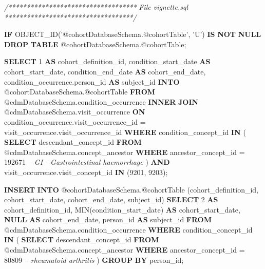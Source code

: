 \documentclass[]{article}
\newenvironment{Shaded}{\begin{snugshade}}{\end{snugshade}}
\newcommand{\CommentTok}[1]{\textcolor[rgb]{0.56,0.35,0.01}{\textit{#1}}}
\newcommand{\DecValTok}[1]{\textcolor[rgb]{0.00,0.00,0.81}{#1}}
\newcommand{\FunctionTok}[1]{\textcolor[rgb]{0.00,0.00,0.00}{#1}}
\newcommand{\KeywordTok}[1]{\textcolor[rgb]{0.13,0.29,0.53}{\textbf{#1}}}
\newcommand{\NormalTok}[1]{#1}
\newcommand{\StringTok}[1]{\textcolor[rgb]{0.31,0.60,0.02}{#1}}
\begin{document}
\begin{Shaded}
\begin{Highlighting}[]
\CommentTok{/***********************************}
\CommentTok{File vignette.sql }
\CommentTok{***********************************/}

\KeywordTok{IF}\NormalTok{ OBJECT_ID(}\StringTok{'@cohortDatabaseSchema.@cohortTable'}\NormalTok{, }\StringTok{'U'}\NormalTok{) }\KeywordTok{IS} \KeywordTok{NOT} \KeywordTok{NULL}
  \KeywordTok{DROP} \KeywordTok{TABLE}\NormalTok{ @cohortDatabaseSchema.@cohortTable;}

\KeywordTok{SELECT} \DecValTok{1} \KeywordTok{AS}\NormalTok{ cohort_definition_id,}
\NormalTok{    condition_start_date }\KeywordTok{AS}\NormalTok{ cohort_start_date,}
\NormalTok{    condition_end_date }\KeywordTok{AS}\NormalTok{ cohort_end_date,}
\NormalTok{    condition_occurrence.person_id }\KeywordTok{AS}\NormalTok{ subject_id}
\KeywordTok{INTO}\NormalTok{ @cohortDatabaseSchema.@cohortTable}
\KeywordTok{FROM}\NormalTok{ @cdmDatabaseSchema.condition_occurrence}
\KeywordTok{INNER} \KeywordTok{JOIN}\NormalTok{ @cdmDatabaseSchema.visit_occurrence}
    \KeywordTok{ON}\NormalTok{ condition_occurrence.visit_occurrence_id = visit_occurrence.visit_occurrence_id}
\KeywordTok{WHERE}\NormalTok{ condition_concept_id }\KeywordTok{IN}\NormalTok{ (}
        \KeywordTok{SELECT}\NormalTok{ descendant_concept_id}
        \KeywordTok{FROM}\NormalTok{ @cdmDatabaseSchema.concept_ancestor}
        \KeywordTok{WHERE}\NormalTok{ ancestor_concept_id = }\DecValTok{192671} \CommentTok{-- GI - Gastrointestinal haemorrhage}
\NormalTok{        )}
    \KeywordTok{AND}\NormalTok{ visit_occurrence.visit_concept_id }\KeywordTok{IN}\NormalTok{ (}\DecValTok{9201}\NormalTok{, }\DecValTok{9203}\NormalTok{);}
    
\KeywordTok{INSERT} \KeywordTok{INTO}\NormalTok{ @cohortDatabaseSchema.@cohortTable }
\NormalTok{(cohort_definition_id, cohort_start_date, cohort_end_date, subject_id)}
\KeywordTok{SELECT} \DecValTok{2} \KeywordTok{AS}\NormalTok{ cohort_definition_id,}
    \FunctionTok{MIN}\NormalTok{(condition_start_date) }\KeywordTok{AS}\NormalTok{ cohort_start_date,}
    \KeywordTok{NULL} \KeywordTok{AS}\NormalTok{ cohort_end_date,}
\NormalTok{    person_id }\KeywordTok{AS}\NormalTok{ subject_id}
\KeywordTok{FROM}\NormalTok{ @cdmDatabaseSchema.condition_occurrence}
\KeywordTok{WHERE}\NormalTok{ condition_concept_id }\KeywordTok{IN}\NormalTok{ (}
        \KeywordTok{SELECT}\NormalTok{ descendant_concept_id}
        \KeywordTok{FROM}\NormalTok{ @cdmDatabaseSchema.concept_ancestor}
        \KeywordTok{WHERE}\NormalTok{ ancestor_concept_id = }\DecValTok{80809} \CommentTok{-- rheumatoid arthritis}
\NormalTok{        )}
\KeywordTok{GROUP} \KeywordTok{BY}\NormalTok{ person_id;}
\end{Highlighting}
\end{Shaded}
\end{document}
